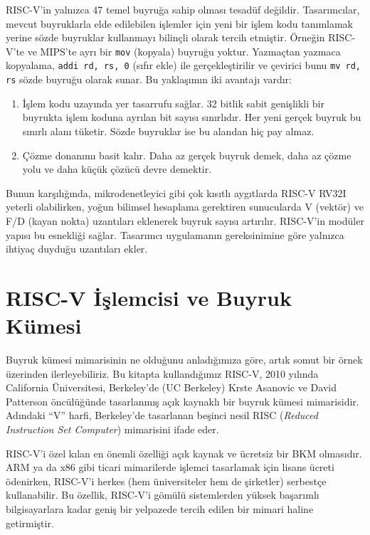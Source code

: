 RISC-V'in yalnızca 47 temel buyruğa sahip olması tesadüf değildir. Tasarımcılar, mevcut buyruklarla elde edilebilen işlemler için yeni bir işlem kodu tanımlamak yerine sözde buyruklar kullanmayı bilinçli olarak tercih etmiştir. Örneğin RISC-V'te ve MIPS'te ayrı bir \texttt{mov} (kopyala) buyruğu yoktur. Yazmaçtan yazmaca kopyalama, \texttt{addi rd, rs, 0} (sıfır ekle) ile gerçekleştirilir ve çevirici bunu \texttt{mv rd, rs} sözde buyruğu olarak sunar. Bu yaklaşımın iki avantajı vardır:

\begin{enumerate}[nosep]
\item İşlem kodu uzayında yer tasarrufu sağlar. 32 bitlik sabit genişlikli bir buyrukta işlem koduna ayrılan bit sayısı sınırlıdır. Her yeni gerçek buyruk bu sınırlı alanı tüketir. Sözde buyruklar ise bu alandan hiç pay almaz.
\item Çözme donanımı basit kalır. Daha az gerçek buyruk demek, daha az çözme yolu ve daha küçük çözücü devre demektir.
\end{enumerate}

Bunun karşılığında, mikrodenetleyici gibi çok kısıtlı aygıtlarda RISC-V RV32I yeterli olabilirken, yoğun bilimsel hesaplama gerektiren sunucularda V (vektör) ve F/D (kayan nokta) uzantıları eklenerek buyruk sayısı artırılır. RISC-V'in modüler yapısı bu esnekliği sağlar. Tasarımcı uygulamanın gereksinimine göre yalnızca ihtiyaç duyduğu uzantıları ekler.

\section{RISC-V İşlemcisi ve Buyruk Kümesi}
\label{sec:riscv-islemcisi}

Buyruk kümesi mimarisinin ne olduğunu anladığımıza göre, artık somut bir örnek üzerinden ilerleyebiliriz. Bu kitapta kullandığımız RISC-V, 2010 yılında California Üniversitesi, Berkeley'de (UC Berkeley) Krste Asanovic ve David Patterson öncülüğünde tasarlanmış açık kaynaklı bir buyruk kümesi mimarisidir. Adındaki ``V'' harfi, Berkeley'de tasarlanan beşinci nesil RISC (\textit{Reduced Instruction Set Computer}) mimarisini ifade eder.

RISC-V'i özel kılan en önemli özelliği açık kaynak ve ücretsiz bir BKM olmasıdır. ARM ya da x86 gibi ticari mimarilerde işlemci tasarlamak için lisans ücreti ödenirken, RISC-V'i herkes (hem üniversiteler hem de şirketler) serbestçe kullanabilir. Bu özellik, RISC-V'i gömülü sistemlerden yüksek başarımlı bilgisayarlara kadar geniş bir yelpazede tercih edilen bir mimari haline getirmiştir.

